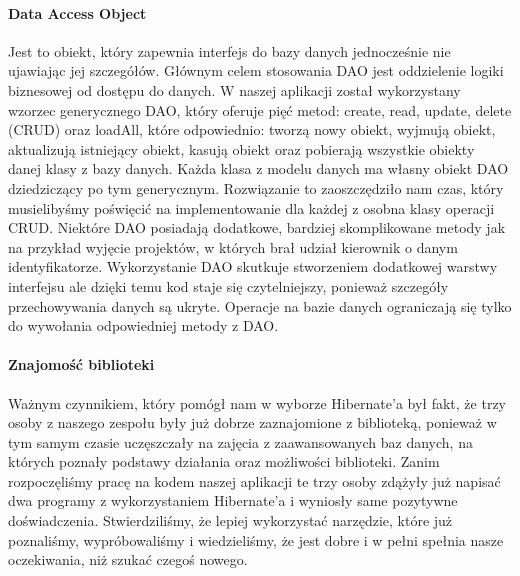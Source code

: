 \documentclass[licencjacka]{pracamgr}
\begin{document}
\paragraph{Data Access Object}
Jest to obiekt, który zapewnia interfejs do bazy danych jednocześnie nie ujawiając jej szczegółów. Głównym celem stosowania DAO jest
oddzielenie logiki biznesowej od dostępu do danych. W naszej aplikacji został wykorzystany wzorzec generycznego DAO, który oferuje 
pięć metod: create, read, update, delete (CRUD) oraz loadAll, które odpowiednio: tworzą nowy obiekt, wyjmują obiekt, aktualizują 
istniejący obiekt, kasują obiekt oraz pobierają wszystkie obiekty danej klasy z bazy danych. Każda klasa z modelu danych ma własny 
obiekt DAO dziedziczący po tym generycznym. Rozwiązanie to zaoszczędziło nam czas, który musielibyśmy poświęcić na implementowanie 
dla każdej z osobna klasy operacji CRUD. Niektóre DAO posiadają dodatkowe, bardziej skomplikowane metody jak na przykład wyjęcie projektów, 
w których brał udział kierownik o danym identyfikatorze. Wykorzystanie DAO skutkuje stworzeniem dodatkowej warstwy interfejsu ale dzięki 
temu kod staje się czytelniejszy, ponieważ szczegóły przechowywania danych są ukryte. Operacje na bazie danych ograniczają 
się tylko do wywołania odpowiedniej metody z DAO.

\paragraph{Znajomość biblioteki} 
Ważnym czynnikiem, który pomógł nam w wyborze Hibernate'a był fakt, że trzy osoby z naszego zespołu 
były już dobrze zaznajomione z biblioteką, ponieważ w tym samym czasie uczęszczały na zajęcia z zaawansowanych baz danych, na których 
poznały podstawy działania oraz możliwości biblioteki. Zanim rozpoczęliśmy pracę na kodem naszej aplikacji te trzy osoby zdążyły już 
napisać dwa programy z wykorzystaniem Hibernate'a i wyniosły same pozytywne doświadczenia. Stwierdziliśmy, że lepiej wykorzystać narzędzie, 
które już poznaliśmy, wypróbowaliśmy i wiedzieliśmy, że jest dobre i w pełni spełnia nasze oczekiwania, niż szukać czegoś nowego.
\end{document}
